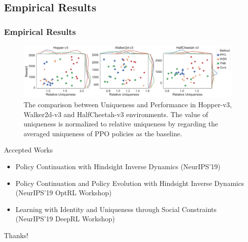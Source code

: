 \documentclass[10pt,hyperref={CJKbookmarks=true},envcountsect,mathserif]{beamer}
\begin{document}
\subsection{Empirical Results}
\begin{frame}
	\frametitle{Empirical Results}
	\begin{figure}[t]
\includegraphics[width=\linewidth]{figures/v8.pdf}
\caption{The comparison between Uniqueness and Performance in Hopper-v3, Walker2d-v3 and HalfCheetah-v3 environments. The value of uniqueness is normalized to relative uniqueness by regarding the averaged uniqueness of PPO policies as the baseline.}


\label{fig_novelty}
\end{figure}
\end{frame}

\begin{frame}{Accepted Works}

\begin{itemize}
\item Policy Continuation with Hindsight Inverse Dynamics (NeurIPS'19)
\item Policy Continuation and Policy Evolution with Hindsight Inverse Dynamics (NeurIPS'19 OptRL Workshop)
\item Learning with Identity and Uniqueness through Social Constraints (NeurIPS'19 DeepRL Workshop)
\end{itemize}
\huge{\centerline{Thanks!}}
\end{frame}
\end{document}
